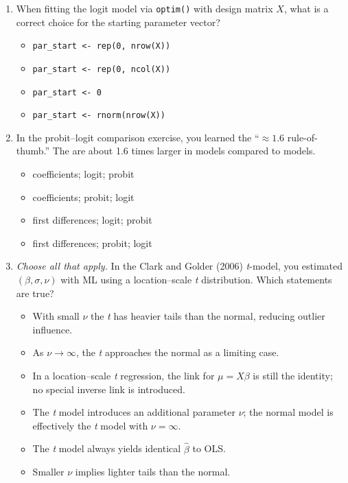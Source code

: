 \documentclass[12pt]{article}
\begin{document}
\begin{enumerate}[label=\textbf{\arabic*.}]
\begin{itemize}
\end{itemize}


\item When fitting the logit model via \verb|optim()| with design matrix \(X\), what is a correct choice for the starting parameter vector?
\begin{itemize}
  \item[A.] \verb|par_start <- rep(0, nrow(X))|
  \item[B.] \verb|par_start <- rep(0, ncol(X))| %
  \item[C.] \verb|par_start <- 0|
  \item[D.] \verb|par_start <- rnorm(nrow(X))|
\end{itemize}

\item In the probit--logit comparison exercise, you learned the ``\(\approx 1.6\) rule-of-thumb.'' The \underline{\hspace{2cm}} are about 1.6 times larger in
\underline{\hspace{2cm}} models compared to \underline{\hspace{2cm}} models.

\begin{itemize}
  \item[A.] coefficients; logit; probit %
  \item[B.] coefficients; probit; logit
  \item[C.] first differences; logit; probit
  \item[D.] first differences; probit; logit
\end{itemize}

\item \textit{Choose all that apply.} In the Clark and Golder (2006) \textit{t}-model, you estimated \((\beta,\sigma,\nu)\) with ML using a location--scale \textit{t} distribution. Which statements are true?
\begin{itemize}
  \item[A.] With small \(\nu\) the \textit{t} has heavier tails than the normal, reducing outlier influence. %
  \item[B.] As \(\nu \to \infty\), the \textit{t} approaches the normal as a limiting case. %
  \item[C.] In a location--scale \textit{t} regression, the link for \(\mu = X\beta\) is still the identity; no special inverse link is introduced. %
  \item[D.] The \textit{t} model introduces an additional parameter \(\nu\); the normal model is effectively the \textit{t} model with \(\nu = \infty\). %
  \item[E.] The \textit{t} model always yields identical \(\hat{\beta}\) to OLS.
  \item[F.] Smaller \(\nu\) implies lighter tails than the normal.
\end{itemize}

\end{enumerate}
\end{document}
